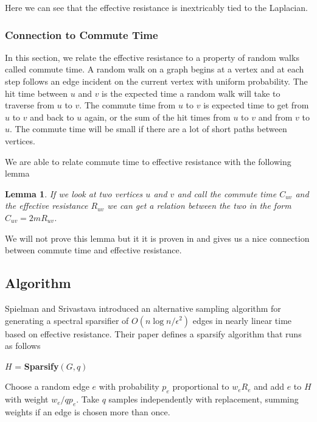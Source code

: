 \documentclass[12pt,twoside]{article}
\newtheorem{lemma}[thm]{Lemma}
\newenvironment{centered}[0]{%
  \begin{list}{}{%
    \setlength{\topsep}{0pt}%
    \setlength{\leftmargin}{.25in}%
    \setlength{\rightmargin}{.25in}%
    \setlength{\listparindent}{\parindent}%
    \setlength{\itemindent}{\parindent}%
    \setlength{\parsep}{\parskip}%
  }
  \item[]}{\end{list}}
\begin{document}
Here we can see that the effective resistance is inextricably tied to the Laplacian.

\subsubsection{Connection to Commute Time}

In this section, we relate the effective resistance to a property of random walks called commute time. A random walk on a graph begins at a vertex and at each step follows an edge incident on the current vertex with uniform probability. The hit time between $u$ and $v$ is the expected time a random walk will take to traverse from $u$ to $v$. The commute time from $u$ to $v$ is expected time to get from $u$ to $v$ and back to $u$ again, or the sum of the hit times from $u$ to $v$ and from $v$ to $u$. The commute time will be small if there are a lot of short paths between vertices. 

We are able to relate commute time to effective resistance with the following lemma
%
\begin{lemma}
\label{lem:commute-time-effective-resist}
If we look at two vertices $u$ and $v$ and call the commute time $C_{uv}$ and the effective resistance $R_{uv}$ we can get a relation between the two in the form $C_{uv} = 2m R_{uv}$.
\end{lemma}
%
We will not prove this lemma but it it is proven in \cite{wisc-effective-resistance} and gives us a nice connection between commute time and effective resistance.

\subsection{Algorithm}

Spielman and Srivastava introduced an alternative sampling algorithm for generating a spectral sparsifier of $O(n\log n/\epsilon^2)$ edges in nearly linear time based on effective resistance. Their paper \cite{spielman-effective-resistance} defines a sparsify algorithm that runs as follows

\begin{centered}
$H$ = \textbf{Sparsify}$(G,q)$

Choose a random edge $e$ with probability $p_e$ proportional to $w_e R_e$ and add $e$ to $H$ with weight $w_e/qp_e$. Take $q$ samples independently with replacement, summing weights if an edge is chosen more than once. 
\end{centered}
\end{document}
